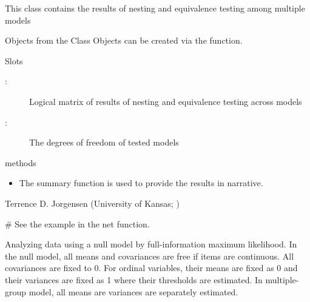 \documentclass[a4paper]{book}
\begin{document}
%
\begin{Description}\relax
This class contains the results of nesting and equivalence testing among multiple models
\end{Description}
%
\begin{Section}{Objects from the Class}
Objects can be created via the  function.
\end{Section}
%
\begin{Section}{Slots}
\begin{description}

\item[:] Logical matrix of results of nesting and equivalence testing across models
\item[:] The degrees of freedom of tested models

\end{description}

\end{Section}
%
\begin{Section}{methods}
\begin{itemize}

\item {} The summary function is used to provide the results in narrative.  

\end{itemize}

\end{Section}
%
\begin{Author}\relax
Terrence D. Jorgensen (University of Kansas; )
\end{Author}
%
\begin{SeeAlso}\relax
{}
\end{SeeAlso}
%
\begin{Examples}
\begin{ExampleCode}
# See the example in the net function.
\end{ExampleCode}
\end{Examples}
%
\begin{Description}\relax
Analyzing data using a null model by full-information maximum likelihood. In the null model, all means and covariances are free if items are continuous. All covariances are fixed to 0. For ordinal variables, their means are fixed as 0 and their variances are fixed as 1 where their thresholds are estimated. In multiple-group model, all means are variances are separately estimated. 
\end{Description}
\end{document}
